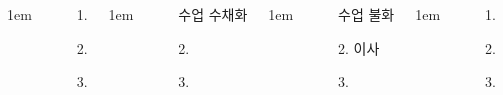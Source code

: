 \documentclass[25pt, a1paper ]{tikzposter}
\begin{document}
\begin{columns}
			{
					\setlength{\leftmargini}{4em}
					\setlength{\labelsep} {1em}
				\begin{LARGE}
					\begin{itemize}
					\item [1.] 
					\item [2.] 
					\item [3.] 
					\end{itemize}
				\end{LARGE}
			}





			{
					\setlength{\leftmargini}{4em}
					\setlength{\labelsep} {1em}
				\begin{LARGE}
					\begin{itemize}
					\item [수업] 수채화
					\item [2.] 
					\item [3.] 
					\end{itemize}
				\end{LARGE}
			}



			{
					\setlength{\leftmargini}{5em}
					\setlength{\labelsep} {1em}
				\begin{LARGE}
					\begin{itemize}
					\item [수업] 불화 
					\item [2.] 이사
					\item [3.] 
					\end{itemize}
				\end{LARGE}
			}


			{
					\setlength{\leftmargini}{4em}
					\setlength{\labelsep} {1em}
				\begin{LARGE}
					\begin{itemize}
					\item [1.] 
					\item [2.] 
					\item [3.] 
					\end{itemize}
				\end{LARGE}
			}



	\end{columns}
\end{document}
